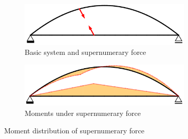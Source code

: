 \begin{figure}[H]
\centering
\begin{subfigure}{0.5\textwidth}
    \centering
    \includegraphics[trim={0 0cm 0 0},clip, width=0.9\textwidth]{overleaf/Appendix/Pictures/min_1.PNG}
    \caption{Basic system and supernumerary force}
    \label{fig:Minimisation_1}
\end{subfigure}%
\begin{subfigure}{.5\textwidth}
    \centering
    \includegraphics[trim={0 0cm 0 0},clip, width=0.9\textwidth]{overleaf/Appendix/Pictures/min_2.PNG}
    \caption{Moments under supernumerary force}
    \label{fig:Minimisation_2}
\end{subfigure}
\caption{Moment distribution of supernumerary force}
\label{fig:Minimisation}
\end{figure}


